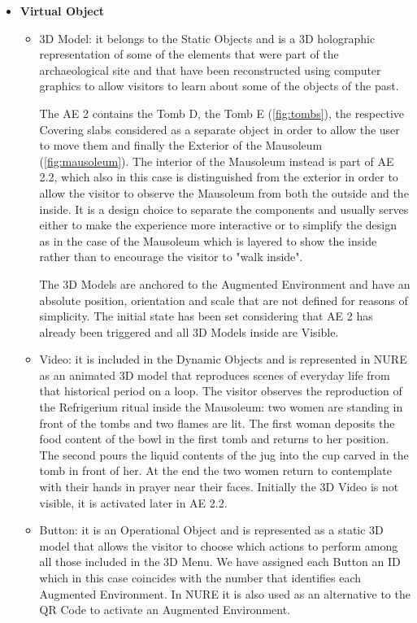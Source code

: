 \begin{itemize}
    \item \textbf{Virtual Object}
    \begin{itemize}
        \item 3D Model: it belongs to the Static Objects and is a 3D holographic representation of some of the elements that were part of the archaeological site and that have been reconstructed using computer graphics to allow visitors to learn about some of the objects of the past. 
        
        The AE 2 contains the Tomb D, the Tomb E (\autoref{fig:tombs}), the respective Covering slabs considered as a separate object in order to allow the user to move them and finally the Exterior of the Mausoleum (\autoref{fig:mausoleum}). The interior of the Mausoleum instead is part of AE 2.2, which also in this case is distinguished from the exterior in order to allow the visitor to observe the Mausoleum from both the outside and the inside. It is a design choice to separate the components and usually serves either to make the experience more interactive or to simplify the design as in the case of the Mausoleum which is layered to show the inside rather than to encourage the visitor to "walk inside".
        
        The 3D Models are anchored to the Augmented Environment and have an absolute position, orientation and scale that are not defined for reasons of simplicity. The initial state has been set considering that AE 2 has already been triggered and all 3D Models inside are Visible.
        \item Video: it is included in the Dynamic Objects and is represented in NURE as an animated 3D model that reproduces scenes of everyday life from that historical period on a loop. 
        The visitor observes the reproduction of the Refrigerium ritual inside the Mausoleum: two women are standing in front of the tombs and two flames are lit. The first woman deposits the food content of the bowl in the first tomb and returns to her position. The second pours the liquid contents of the jug into the cup carved in the tomb in front of her. At the end the two women return to contemplate with their hands in prayer near their faces. Initially the 3D Video is not visible, it is activated later in AE 2.2.
        \item Button: it is an Operational Object and is represented as a static 3D model that allows the visitor to choose which actions to perform among all those included in the 3D Menu. We have assigned each Button an ID which in this case coincides with the number that identifies each Augmented Environment. In NURE it is also used as an alternative to the QR Code to activate an Augmented Environment.
    \end{itemize}
\end{itemize}

